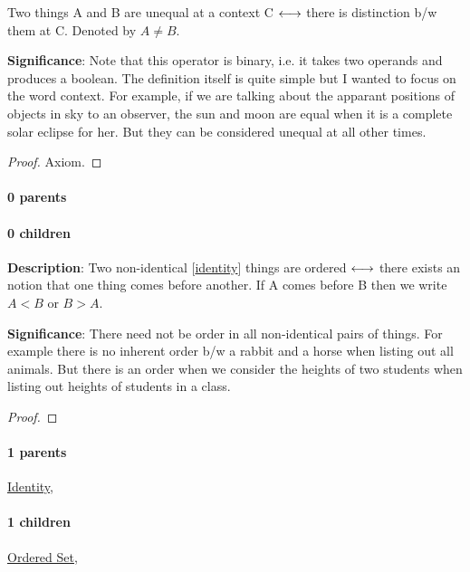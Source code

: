 \documentclass[../main.tex]{subfiles}
\begin{document}
Two things A and B are unequal at a context C $ \longleftrightarrow $ there is distinction b/w them at C. Denoted by $ A \ne B $.
\par
{\color{magenta} \textbf{Significance}:
Note that this operator is binary, i.e. it takes two operands and produces a boolean.
The definition itself is quite simple but I wanted to focus on the word context.
For example, if we are talking about the apparant positions of objects in sky to an observer, the sun and moon are equal when it is a complete solar eclipse for her.
But they can be considered unequal at all other times.
\par}
\begin{proof}Axiom.\end{proof}\par
\paragraph{0 parents} 
\paragraph{0 children} 



\begin{statement}
\label{statement:Order}\hspace*{0pt}\par
\end{statement}
\textbf{Description}:
Two non-identical [\hyperref[statement:Identity]{identity}] things are ordered $ \longleftrightarrow $ there exists an notion that one thing comes before another. If A comes before B then we write $ A < B $ or $ B > A $.
\par
{\color{magenta} \textbf{Significance}:
There need not be order in all non-identical pairs of things. For example there is no inherent order b/w a rabbit and a horse when listing out all animals. But there is an order when we consider the heights of two students when listing out heights of students in a class.
\par}
\begin{proof}
\proofbydefinition
\end{proof}\par
\paragraph{1 parents} \hyperref[statement:Identity]{Identity}, 
\paragraph{1 children} \hyperref[statement:Ordered Set]{Ordered Set}, 
\end{document}
